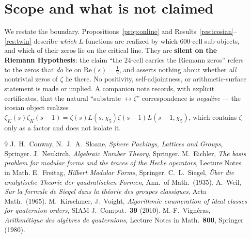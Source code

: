 \documentclass[11pt]{article}
\theoremstyle{definition}
\newcommand{\zetaK}{\zeta_{K}}
\begin{document}
\section{Scope and what is not claimed}\label{sec:scope}
We restate the boundary. Propositions~\ref{prop:online} and
Results~\ref{res:icosian}--\ref{res:twin} describe \emph{which} $L$-functions are
realized by which $600$-cell sub-objects, and which of their zeros lie on the
critical line. They are \textbf{silent on the Riemann Hypothesis}: the claim
``the $24$-cell carries the Riemann zeros'' refers to the zeros that \emph{do} lie
on $\mathrm{Re}(s)=\tfrac12$, and asserts nothing about whether \emph{all}
nontrivial zeros of $\zeta$ lie there. No positivity, self-adjointness, or
arithmetic-surface statement is made or implied. A companion note records, with
explicit certificates, that the natural ``substrate $\leftrightarrow\zeta$''
correspondence is \emph{negative} --- the icosian object realizes
$\zetaK(s)\zetaK(s-1)=\zeta(s)L(s,\chi_5)\zeta(s-1)L(s-1,\chi_5)$, which contains
$\zeta$ only as a factor and does not isolate it.

\begin{thebibliography}{9}
 J.~H.~Conway, N.~J.~A.~Sloane,
  \emph{Sphere Packings, Lattices and Groups}, Springer.
 J.~Neukirch, \emph{Algebraic Number Theory}, Springer.
 M.~Eichler, \emph{The basis problem for modular forms and the
  traces of the Hecke operators}, Lecture Notes in Math.
 E.~Freitag, \emph{Hilbert Modular Forms}, Springer.
 C.~L.~Siegel, \emph{\"Uber die analytische Theorie der
  quadratischen Formen}, Ann.\ of Math.\ (1935).
 A.~Weil, \emph{Sur la formule de Siegel dans la th\'eorie des
  groupes classiques}, Acta Math.\ (1965).
 M.~Kirschmer, J.~Voight, \emph{Algorithmic enumeration of
  ideal classes for quaternion orders}, SIAM J.\ Comput.\ \textbf{39} (2010).
 M.-F.~Vign\'eras, \emph{Arithm\'etique des alg\`ebres de
  quaternions}, Lecture Notes in Math.\ \textbf{800}, Springer (1980).
\end{thebibliography}
\end{document}
